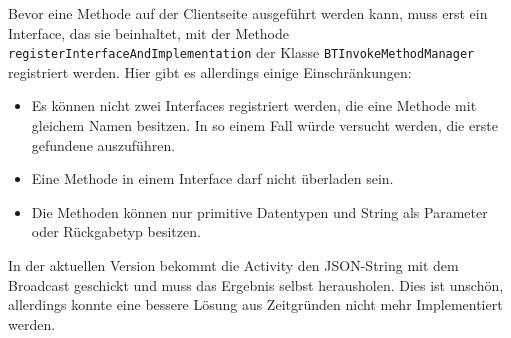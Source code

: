 \begin{minipage}{\linewidth}
\begin{sloppypar}
Bevor eine Methode auf der Clientseite ausgeführt werden kann, muss erst ein Interface, das sie beinhaltet, mit der Methode \lstinline{registerInterfaceAndImplementation} der Klasse \lstinline{BTInvokeMethodManager} registriert werden. Hier gibt es allerdings einige Einschränkungen:
\end{sloppypar}
\begin{itemize}
  \item Es können nicht zwei Interfaces registriert werden, die eine Methode mit gleichem Namen besitzen. In so einem Fall würde versucht werden, die erste gefundene auszuführen.
  \item Eine Methode in einem Interface darf nicht überladen sein.
  \item Die Methoden können nur primitive Datentypen und String als Parameter oder Rückgabetyp besitzen.
\end{itemize}
\end{minipage}

In der aktuellen Version bekommt die Activity den JSON-String mit dem Broadcast geschickt und muss das Ergebnis selbst herausholen. Dies ist unschön, allerdings konnte eine bessere Lösung aus Zeitgründen nicht mehr Implementiert werden.

